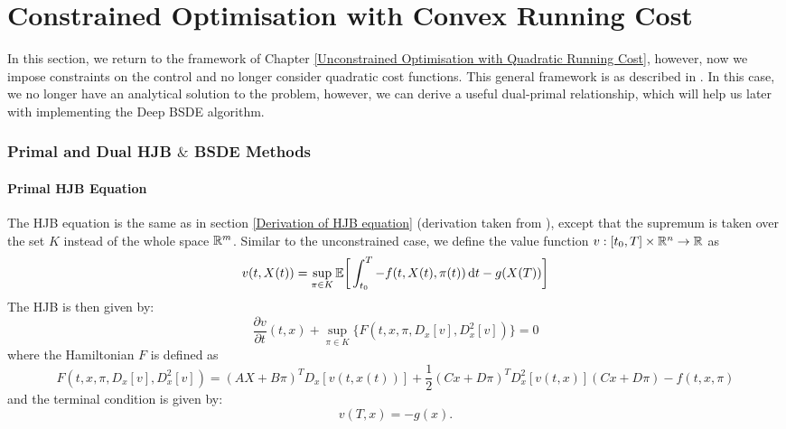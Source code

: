 \chapter{Constrained Optimisation with Convex Running Cost} \label{sec: general}

In this section, we return to the framework of Chapter \ref{Unconstrained Optimisation with Quadratic Running Cost}, however, now we impose constraints on the control and no longer consider quadratic cost functions. This general framework is as described in \cite{Duality_Method_for_Multidimensional_Nonsmooth_Constrained_Linear_Convex_Stochastic_Control}. In this case, we no longer have an analytical solution to the problem, however, we can derive a useful dual-primal relationship, which will help us later with implementing the Deep BSDE algorithm. 

\subsection{Primal and Dual HJB \texorpdfstring{$\&$ } BBSDE Methods}
\subsubsection{Primal HJB Equation}
The HJB equation is the same as in section \ref{Derivation of HJB equation} (derivation taken from \cite{Pham}), except that the supremum is taken over the set $K$ instead of the whole space $\mathbb{R}^m$. Similar to the unconstrained case, we define the value function $v: [t_0, T] \times \mathbb{R}^n \to \mathbb{R}$ as
\begin{equation*}
    v(t,X(t)) = \sup_{\pi \in K} \mathbb{E} \bigg[ \int_{t_0}^T - f(t, X(t), \pi(t)) \mathop{}\!\mathrm{d} t - g(X(T))  \bigg]
\end{equation*}
The HJB is then given by:
\begin{equation}
    \frac{\partial v}{\partial t} (t,x) + \sup_{\pi \in K} \big\{F(t, x, \pi, D_x[v], D_x^2[v]) \big\} = 0 \label{eq: constrained_primal_hjb_equation}
\end{equation}
where the Hamiltonian $F$ is defined as 
\begin{equation*}
    F(t, x, \pi, D_x[v], D_x^2[v] ) = (AX + B \pi)^T D_x [v(t, x(t))] + \frac12 (C x + D \pi)^T D_x^2[v(t,x)] (C x + D \pi) - f(t, x, \pi)
\end{equation*}
and the terminal condition is given by:
\begin{equation*}
    v(T,x) = - g(x).
\end{equation*}




